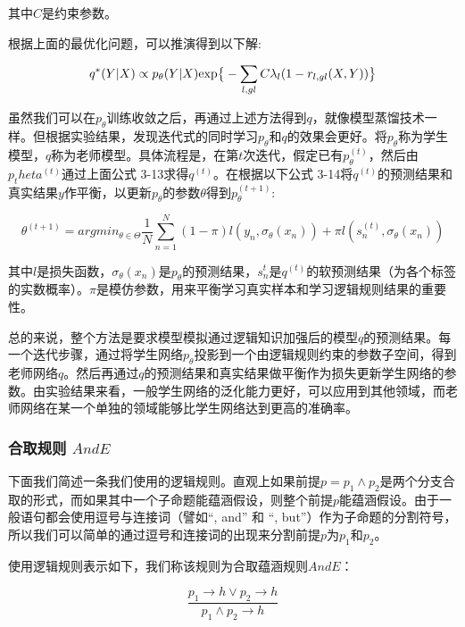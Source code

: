 \documentclass[UTF8,11pt,a4paper,nofonts]{ctexart}
\numberwithin{equation}{section}
\begin{document}
其中$C$是约束参数。

根据上面的最优化问题，可以推演得到以下解\cite{Hu2016HarnessingDN}:

\begin{equation}
q^*(Y|X) \propto p_\theta(Y|X) \text{exp} \big{\{} -\sum_{l,gl}C\lambda_l(1-r_{l,gl}(X,Y)) \big{\}}
\end{equation}

虽然我们可以在$p_\theta$训练收敛之后，再通过上述方法得到$q$，就像模型蒸馏技术\cite{Hinton2015DistillingTK, LopezPaz2015UnifyingDA}一样。但根据实验结果，发现迭代式的同时学习$p_\theta$和$q$的效果会更好。\cite{Hu2016HarnessingDN}将$p_\theta$称为学生模型，$q$称为老师模型。具体流程是，在第$t$次迭代，假定已有$p_\theta^{(t)}$，然后由$p_theta^{(t)}$通过上面公式 3-13求得$q^{(t)}$。在根据以下公式 3-14将$q^{(t)}$的预测结果和真实结果$y$作平衡，以更新$p_\theta$的参数$\theta$得到$p_\theta^{(t+1)}$:

\begin{equation}
\theta^{(t+1)} = argmin_{\theta\in \Theta} \frac{1}{N}\sum^N_{n=1}(1-\pi)l(y_n,\sigma_\theta(x_n)) + \pi l(s^{(t)}_n,\sigma_\theta(x_n)) 
\end{equation}

其中$l$是损失函数，$\sigma_\theta(x_n)$是$p_\theta$的预测结果，$s_n^{t}$是$q^{(t)}$的软预测结果（为各个标签的实数概率）。$\pi$是模仿参数，用来平衡学习真实样本和学习逻辑规则结果的重要性。

总的来说，整个方法是要求模型模拟通过逻辑知识加强后的模型$q$的预测结果。每一个迭代步骤，通过将学生网络$p_\theta$投影到一个由逻辑规则约束的参数子空间，得到老师网络$q$。然后再通过$q$的预测结果和真实结果做平衡作为损失更新学生网络的参数。由实验结果来看，一般学生网络的泛化能力更好，可以应用到其他领域，而老师网络在某一个单独的领域能够比学生网络达到更高的准确率。

\subsubsection{合取规则 $AndE$}

下面我们简述一条我们使用的逻辑规则。直观上如果前提$p=p_1 \land p_2$是两个分支合取的形式，而如果其中一个子命题能蕴涵假设，则整个前提$p$能蕴涵假设。由于一般语句都会使用逗号与连接词（譬如“, and” 和 “, but”）作为子命题的分割符号，所以我们可以简单的通过逗号和连接词的出现来分割前提$p$为$p_1$和$p_2$。

使用逻辑规则表示如下，我们称该规则为合取蕴涵规则$AndE$：

\begin{equation}
\frac{p_1 \to h \vee p_2 \to h}{p_1 \land p_2 \to h}
\end{equation}
\end{document}
